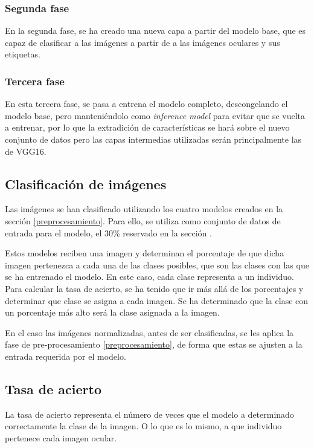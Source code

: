 \subsubsection{Segunda fase}

En la segunda fase, se ha creado una nueva capa a partir del modelo base, que es capaz de clasificar a las imágenes a partir de a las imágenes oculares y sus etiquetas. 

\subsubsection{Tercera fase}

En esta tercera fase, se pasa a entrena el modelo completo, descongelando el modelo base, pero manteniéndolo como \textit{inference model} para evitar que se vuelta a entrenar, por lo que la extradición de características se hará sobre el nuevo conjunto de datos pero las capas intermedias utilizadas serán principalmente las de VGG16.

\subsection{Clasificación de imágenes}

Las imágenes se han clasificado utilizando los cuatro modelos creados en la sección \ref{preprocesamiento}. Para ello, se utiliza como conjunto de datos de entrada para el modelo, el 30\% reservado en la sección .

Estos modelos reciben una imagen y determinan el porcentaje de que dicha imagen pertenezca a cada una de las clases posibles, que son las clases con las que se ha entrenado el modelo. En este caso, cada clase representa a un individuo. Para calcular la tasa de acierto, se ha tenido que ir más allá de los porcentajes y determinar que clase se asigna a cada imagen. Se ha determinado que la clase con un porcentaje más alto será la clase asignada a la imagen.

En el caso las imágenes normalizadas, antes de ser clasificadas, se les aplica la fase de pre-procesamiento \ref{preprocesamiento}, de forma que estas se ajusten a la entrada requerida por el modelo.

\subsection{Tasa de acierto} 

La tasa de acierto representa el número de veces que el modelo a determinado correctamente la clase de la imagen. O lo que es lo mismo, a que individuo pertenece cada imagen ocular.

